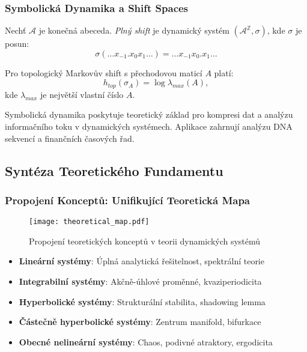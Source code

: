 \subsubsection{Symbolická Dynamika a Shift Spaces}

\begin{definition}
Nechť $\mathcal{A}$ je konečná abeceda. \emph{Plný shift} je dynamický systém $(\mathcal{A}^\mathbb{Z}, \sigma)$, kde $\sigma$ je posun:
\[
\sigma(\dots x_{-1}.x_0x_1\dots) = \dots x_{-1}x_0.x_1\dots
\]
\end{definition}

\begin{theorem}
Pro topologický Markovův shift s přechodovou maticí $A$ platí:
\[
h_{top}(\sigma_A) = \log \lambda_{max}(A),
\]
kde $\lambda_{max}$ je největší vlastní číslo $A$.
\end{theorem}

\begin{application}
Symbolická dynamika poskytuje teoretický základ pro kompresi dat a analýzu informačního toku v dynamických systémech. Aplikace zahrnují analýzu DNA sekvencí a finančních časových řad.
\end{application}

\spc

\subsection{Syntéza Teoretického Fundamentu}

\subsubsection{Propojení Konceptů: Unifikující Teoretická Mapa}

\begin{figure}[H]
\centering
\texttt{[image: theoretical\_map.pdf]}
\caption{Propojení teoretických konceptů v teorii dynamických systémů}
\label{fig:theoretical_map}
\end{figure}

\begin{keyinsight}
\begin{itemize}
\item \textbf{Lineární systémy}: Úplná analytická řešitelnost, spektrální teorie
\item \textbf{Integrabilní systémy}: Akčně-úhlové proměnné, kvaziperiodicita  
\item \textbf{Hyperbolické systémy}: Strukturální stabilita, shadowing lemma
\item \textbf{Částečně hyperbolické systémy}: Zentrum manifold, bifurkace
\item \textbf{Obecné nelineární systémy}: Chaos, podivné atraktory, ergodicita
\end{itemize}
\end{keyinsight}

